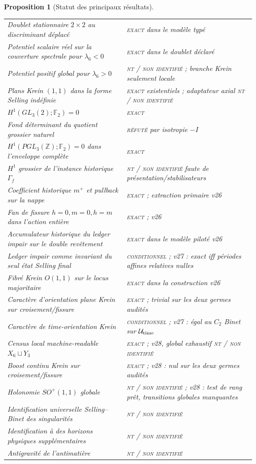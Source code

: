 \documentclass[11pt,a4paper]{article}
\newtheorem{proposition}[theorem]{Proposition}
\newcommand{\Z}{\mathbb Z}
\newcommand{\statusExact}{\textsc{exact}}
\newcommand{\statusCond}{\textsc{conditionnel}}
\newcommand{\statusNT}{\textsc{nt / non identifié}}
\begin{document}
\begin{proposition}[Statut des principaux résultats]
\begin{longtable}{@{}p{}p{}@{}}
Doublet stationnaire $2\times2$ au discriminant déplacé & \statusExact{} dans le modèle typé\\
Potentiel scalaire réel sur la couverture spectrale pour $\lambda_6<0$ & \statusExact{} dans le doublet déclaré\\
Potentiel positif global pour $\lambda_6>0$ & \statusNT{} ; branche Krein seulement locale\\
Plans Krein $(1,1)$ dans la forme Selling indéfinie & \statusExact{} existentiels ; adaptateur axial \statusNT{}\\
$H^1(GL_3(2);\mathbb F_2)=0$ & \statusExact\\
Fond déterminant du quotient grossier naturel & \textsc{réfuté} par isotropie $-I$\\
$H^1(PGL_3(\Z);\mathbb F_2)=0$ dans l'enveloppe complète & \statusExact\\
$H^1$ grossier de l'instance historique $\Gamma_f$ & \statusNT{} faute de présentation/stabilisateurs\\
Coefficient historique $m^+$ et pullback sur la nappe & \statusExact{} ; extraction primaire v26\\
Fan de fissure $h=0,m=0,h=m$ dans l'action entière & \statusExact{} ; v26\\
Accumulateur historique du ledger impair sur le double revêtement & \statusExact{} dans le modèle piloté v26\\
Ledger impair comme invariant du seul état Selling final & \statusCond{} ; v27 : exact iff périodes affines relatives nulles\\
Fibré Krein $O(1,1)$ sur le locus majoritaire & \statusExact{} dans la construction v26\\
Caractère d'orientation plane Krein sur croisement/fissure & \statusExact{} ; trivial sur les deux germes audités\\
Caractère de time-orientation Krein & \statusCond{} ; v27 : égal au $C_2$ Binet sur $\mathcal U_{\rm time}$\\
Census local machine-readable $X_6\sqcup Y_3$ & \statusExact{} ; v28, global exhaustif \statusNT{}\\
Boost continu Krein sur croisement/fissure & \statusExact{} ; v28 : nul sur les deux germes audités\\
Holonomie $SO^+(1,1)$ globale & \statusNT{} ; v28 : test de rang prêt, transitions globales manquantes\\
Identification universelle Selling--Binet des singularités & \statusNT\\
Identification à des horizons physiques supplémentaires & \statusNT\\
Antigravité de l'antimatière & \statusNT\\
\bottomrule
\end{longtable}
\end{proposition}
\end{document}
